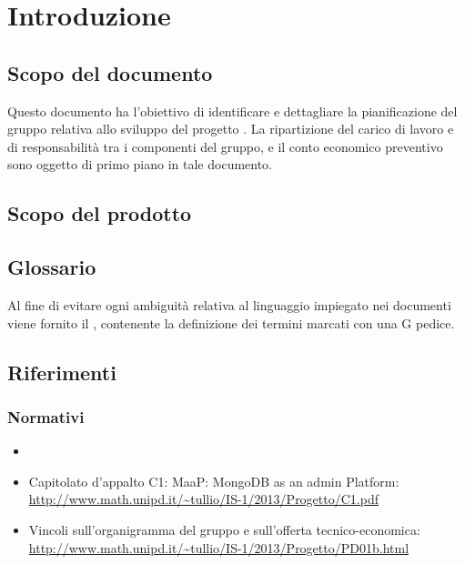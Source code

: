 \section{Introduzione}

	\subsection{Scopo del documento}

Questo documento ha l'obiettivo di identificare e dettagliare la pianificazione del gruppo \GroupName{} relativa allo sviluppo del progetto \ProjectName{}. La ripartizione del carico di lavoro e di responsabilità tra i componenti del gruppo, e il conto economico preventivo sono oggetto di primo piano in tale documento.

	\subsection{Scopo del prodotto}

\ScopoDelProdotto

	\subsection{Glossario}

Al fine di evitare ogni ambiguità relativa al linguaggio impiegato nei documenti viene fornito il \Glossario{} , contenente la definizione dei termini marcati con una G pedice.
	
	\subsection{Riferimenti}
	\label{Riferimenti}
	
		\subsubsection{Normativi}
		
		\begin{itemize}
		\item \NormeDiProgetto
		\item Capitolato d'appalto C1: MaaP: MongoDB as an admin Platform:\\
			\url{http://www.math.unipd.it/~tullio/IS-1/2013/Progetto/C1.pdf}
		\item Vincoli sull'organigramma del gruppo e sull'offerta tecnico-economica:\\
			\url{http://www.math.unipd.it/~tullio/IS-1/2013/Progetto/PD01b.html}
        \end{itemize}
        
